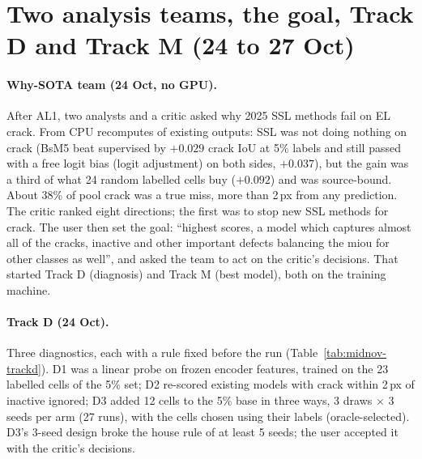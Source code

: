 \section{Two analysis teams, the goal, Track D and Track M (24 to 27 Oct)}\label{sec:midnov-tracks}

\paragraph{Why-SOTA team (24 Oct, no GPU).} After AL1, two analysts and a critic asked why 2025 SSL methods fail on EL crack. From
CPU recomputes of existing outputs: SSL was not doing nothing on crack (BsM5 beat supervised by $+0.029$ crack IoU at 5\% labels and
still passed with a free logit bias (logit adjustment) on both sides, $+0.037$), but the gain was a third of what 24 random labelled cells buy
($+0.092$) and was source-bound. About 38\% of pool crack was a true miss, more than 2\,px from any prediction. The critic ranked
eight directions; the first was to stop new SSL methods for crack. The user then set the goal: ``highest scores, a model which
captures almost all of the cracks, inactive and other important defects balancing the miou for other classes as well'', and asked
the team to act on the critic's decisions. That started Track D (diagnosis) and Track M (best model), both on the training machine.

\paragraph{Track D (24 Oct).} Three diagnostics, each with a rule fixed before the run (Table~\ref{tab:midnov-trackd}).
D1 was a linear probe on frozen encoder features, trained on the 23 labelled cells of the 5\% set; D2 re-scored existing models with
crack within 2\,px of inactive ignored; D3 added 12 cells to the 5\% base in three ways, 3 draws $\times$ 3 seeds per arm (27 runs),
with the cells chosen using their labels (oracle-selected). D3's 3-seed design broke the house rule of at least 5 seeds; the user
accepted it with the critic's decisions.


